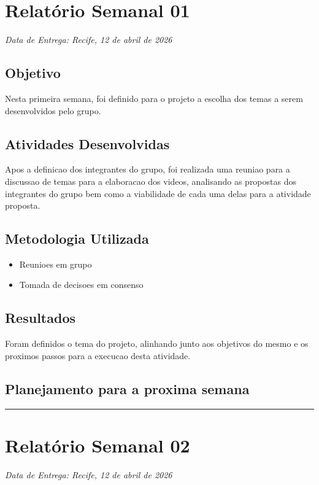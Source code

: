 
\section{Relatório Semanal 01}
{\centering\noindent\textit{Data de Entrega: Recife, 12 de abril de 2026}\par}\bigskip

\subsection{Objetivo}
Nesta primeira semana, foi definido para o projeto a escolha dos temas a serem desenvolvidos pelo grupo.

\subsection{Atividades Desenvolvidas}
Apos a definicao dos integrantes do grupo, foi realizada uma reuniao para a discussao de temas para a elaboracao dos videos, analisando as propostas dos integrantes do grupo bem como a viabilidade de cada uma delas para a atividade proposta.

\subsection{Metodologia Utilizada}
\begin{itemize}
    \item Reunioes em grupo
    \item Tomada de decisoes em consenso
\end{itemize}

\subsection{Resultados}
Foram definidos o tema do projeto, alinhando junto aos objetivos do mesmo e os proximos passos para a execucao desta atividade.

\subsection{Planejamento para a proxima semana}

\bigskip
\hrule
\bigskip

\section{Relatório Semanal 02}
{\centering\noindent\textit{Data de Entrega: Recife, 12 de abril de 2026}\par}\bigskip

